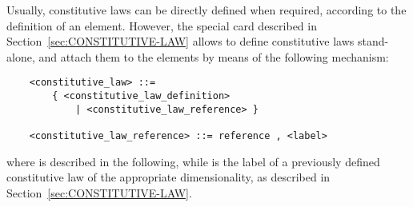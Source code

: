 \noindent
Usually, constitutive laws can be directly defined when required,
according to the definition of an element.
However, the special card described in Section~\ref{sec:CONSTITUTIVE-LAW}
allows to define constitutive laws stand-alone, and attach them
to the elements by means of the following mechanism:
\begin{verbatim}
    <constitutive_law> ::=
        { <constitutive_law_definition>
            | <constitutive_law_reference> }

    <constitutive_law_reference> ::= reference , <label>
\end{verbatim}
where  is described in the following,
while  is the label of a previously defined constitutive law
of the appropriate dimensionality, as described
in Section~\ref{sec:CONSTITUTIVE-LAW}.



